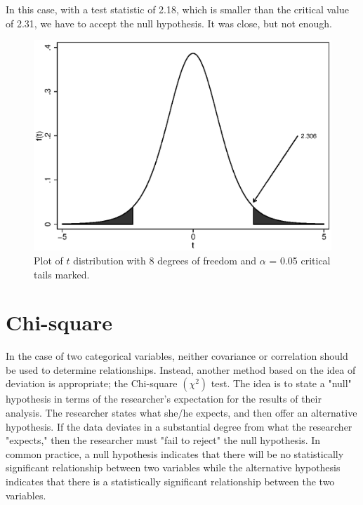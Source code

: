 In this case, with a test statistic of 2.18, which is smaller than the critical value of 2.31, we have to accept the null hypothesis. It was close, but not enough.
\begin{figure}
   \centering
   \includegraphics[angle=0,
           width=.75\textwidth]{critical.eps}
   \caption{Plot of $t$ distribution with 8 degrees of freedom and $\alpha$ = 0.05 critical tails marked.}
  \label{fig:critical}
\end{figure}

\section{Chi-square}
In the case of two categorical variables, neither covariance or correlation should be used to determine relationships. Instead, another method based on the idea of deviation is appropriate; the Chi-square $\left(\chi^2\right)$ test. The idea is to state a "null" hypothesis in terms of the researcher's expectation for the results of their analysis. The researcher states what she/he expects, and then offer an alternative hypothesis. If the data deviates in a substantial degree from what the researcher "expects," then the researcher must "fail to reject" the null hypothesis. In common practice, a null hypothesis indicates that there will be no statistically significant relationship between two variables while the alternative hypothesis indicates that there is a statistically significant relationship between the two variables.

